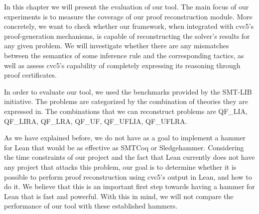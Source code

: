 In this chapter we will present the evaluation of our tool.
%
The main focus of our experiments is to measure the coverage
of our proof reconstruction module.
%
More concretely, we want to check whether our framework, when
integrated with cvc5's proof-generation mechanisms, is capable
of reconstructing the solver's results for any given problem.
%
We will investigate whether there are any mismatches between
the semantics of some inference rule and the corresponding tactics,
as well as assess cvc5's capability of completely expressing
its reasoning through proof certificates.

In order to evaluate our tool, we used the benchmarks provided
by the SMT-LIB initiative. The problems are categorized
by the combination of theories they are expressed in. The combinations
that we can reconstruct problems are QF\_LIA, QF\_LIRA, QF\_LRA, QF\_UF, QF\_UFLIA, QF\_UFLRA.

As we have explained before, we do not have as a goal to implement a hammer
for Lean that would be as effective as SMTCoq or Sledgehammer.
%
Considering the time constraints of our project and the fact that
Lean currently does not have any project that attacks this problem, our goal
is to determine whether it is possible to perform proof reconstruction
using cvc5's output in Lean, and how to do it.
%
We believe that this is an important first step towards having
a hammer for Lean that is fast and powerful.
%
With this in mind, we will not compare the performance of our tool
with these established hammers.



